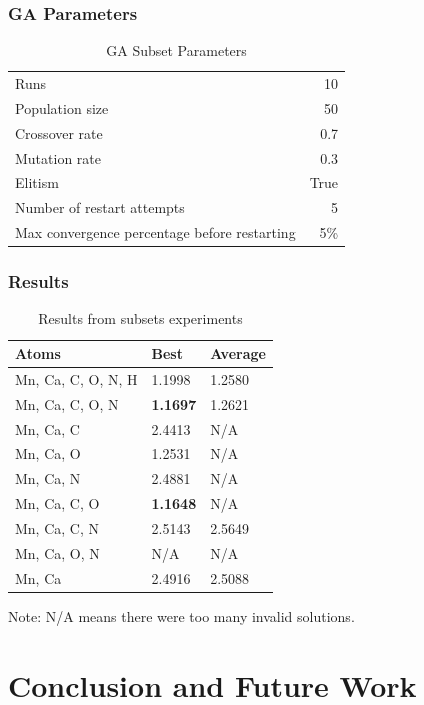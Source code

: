 \documentclass[10pt]{beamer}
\begin{document}
\begin{frame}
	\frametitle{GA Parameters}

	\begin{table}
		\caption{GA Subset Parameters}
		\begin{tabular}{ l r }
		  \hline
		    Runs & 10 \\
		    Population size & 50 \\
		    Crossover rate & 0.7 \\
		    Mutation rate & 0.3 \\
		    Elitism & True \\
		    Number of restart attempts & 5 \\
		    Max convergence percentage before restarting & 5\% \\
		  \hline
		\end{tabular}
	\end{table}

\end{frame}

\begin{frame}
	\frametitle{Results}

	\begin{table}
		\caption{Results from subsets experiments}
		\begin{tabular}{ | l | l | l | }
			\hline
			Atoms & Best & Average \\ \hline \hline
			Mn, Ca, C, O, N, H & 1.1998 & 1.2580 \\ \hline
			Mn, Ca, C, O, N & \textbf{1.1697} & 1.2621 \\ \hline
			Mn, Ca, C & 2.4413 & N/A \\ \hline
			Mn, Ca, O & 1.2531 & N/A \\ \hline
			Mn, Ca, N & 2.4881 & N/A \\ \hline
			Mn, Ca, C, O & \textbf{1.1648} & N/A \\ \hline
			Mn, Ca, C, N & 2.5143 & 2.5649 \\ \hline
			Mn, Ca, O, N & N/A & N/A \\ \hline
			Mn, Ca & 2.4916 & 2.5088 \\ \hline
		\end{tabular}
	\end{table}

	Note: N/A means there were too many invalid solutions.

\end{frame}

\section{Conclusion and Future Work}
\end{document}
